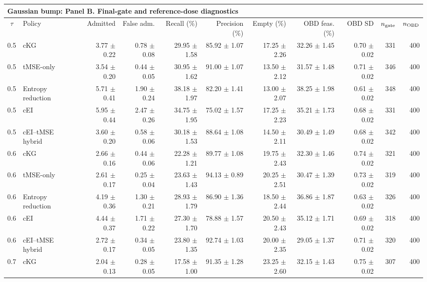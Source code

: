 \begin{tabular}{@{}clrrrrrrrrr@{}}
\multicolumn{11}{l}{\textbf{Gaussian bump: Panel B. Final-gate and reference-dose diagnostics}} \\
\toprule
$\tau$ & Policy & Admitted & False adm. & Recall (\%) & Precision (\%) & Empty (\%) & OBD feas. (\%) & OBD SD & $n_{\rm gate}$ & $n_{\rm OBD}$ \\
\midrule
0.5 & cKG & 3.77 $\pm$ 0.22 & 0.78 $\pm$ 0.08 & 29.95 $\pm$ 1.58 & 85.92 $\pm$ 1.07 & 17.25 $\pm$ 2.26 & 32.26 $\pm$ 1.45 & 0.70 $\pm$ 0.02 & 331 & 400 \\
0.5 & tMSE-only & 3.54 $\pm$ 0.20 & 0.44 $\pm$ 0.05 & 30.95 $\pm$ 1.62 & 91.00 $\pm$ 1.07 & 13.50 $\pm$ 2.12 & 31.57 $\pm$ 1.48 & 0.71 $\pm$ 0.02 & 346 & 400 \\
0.5 & Entropy reduction & 5.71 $\pm$ 0.41 & 1.90 $\pm$ 0.24 & 38.18 $\pm$ 1.97 & 82.20 $\pm$ 1.41 & 13.00 $\pm$ 2.07 & 38.25 $\pm$ 1.98 & 0.61 $\pm$ 0.02 & 348 & 400 \\
0.5 & cEI & 5.95 $\pm$ 0.44 & 2.47 $\pm$ 0.26 & 34.75 $\pm$ 1.95 & 75.02 $\pm$ 1.57 & 17.25 $\pm$ 2.23 & 35.21 $\pm$ 1.73 & 0.68 $\pm$ 0.02 & 331 & 400 \\
0.5 & cEI--tMSE hybrid & 3.60 $\pm$ 0.20 & 0.58 $\pm$ 0.06 & 30.18 $\pm$ 1.53 & 88.64 $\pm$ 1.08 & 14.50 $\pm$ 2.11 & 30.49 $\pm$ 1.49 & 0.68 $\pm$ 0.02 & 342 & 400 \\
0.6 & cKG & 2.66 $\pm$ 0.16 & 0.44 $\pm$ 0.06 & 22.28 $\pm$ 1.21 & 89.77 $\pm$ 1.08 & 19.75 $\pm$ 2.43 & 32.30 $\pm$ 1.46 & 0.74 $\pm$ 0.02 & 321 & 400 \\
0.6 & tMSE-only & 2.61 $\pm$ 0.17 & 0.25 $\pm$ 0.04 & 23.63 $\pm$ 1.43 & 94.13 $\pm$ 0.89 & 20.25 $\pm$ 2.51 & 30.47 $\pm$ 1.39 & 0.73 $\pm$ 0.02 & 319 & 400 \\
0.6 & Entropy reduction & 4.19 $\pm$ 0.36 & 1.30 $\pm$ 0.21 & 28.93 $\pm$ 1.79 & 86.90 $\pm$ 1.36 & 18.50 $\pm$ 2.44 & 36.86 $\pm$ 1.87 & 0.63 $\pm$ 0.02 & 326 & 400 \\
0.6 & cEI & 4.44 $\pm$ 0.37 & 1.71 $\pm$ 0.22 & 27.30 $\pm$ 1.70 & 78.88 $\pm$ 1.57 & 20.50 $\pm$ 2.43 & 35.12 $\pm$ 1.71 & 0.69 $\pm$ 0.02 & 318 & 400 \\
0.6 & cEI--tMSE hybrid & 2.72 $\pm$ 0.17 & 0.34 $\pm$ 0.05 & 23.80 $\pm$ 1.35 & 92.74 $\pm$ 1.03 & 20.00 $\pm$ 2.35 & 29.05 $\pm$ 1.37 & 0.71 $\pm$ 0.02 & 320 & 400 \\
0.7 & cKG & 2.04 $\pm$ 0.13 & 0.28 $\pm$ 0.05 & 17.58 $\pm$ 1.00 & 91.35 $\pm$ 1.28 & 23.25 $\pm$ 2.60 & 32.15 $\pm$ 1.43 & 0.75 $\pm$ 0.02 & 307 & 400 \\

\end{tabular}

